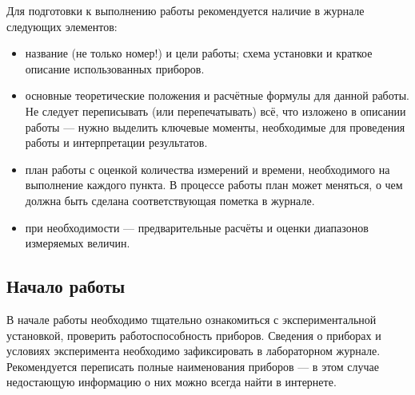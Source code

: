 Для подготовки к выполнению работы рекомендуется наличие в журнале следующих элементов:
\begin{itemize}
    \small
    \item название (не только номер!) и цели работы; схема установки и краткое описание использованных приборов.


    \item основные теоретические положения и расчётные формулы для данной работы.
    Не следует переписывать (или перепечатывать) всё, что изложено в описании
    работы --- нужно выделить ключевые моменты, необходимые для
    проведения работы и интерпретации результатов.

 \item план работы с оценкой количества измерений и времени, необходимого на выполнение каждого пункта.
В процессе работы план может меняться, о чем должна
быть сделана соответствующая пометка в журнале.
     \item при необходимости --- предварительные расчёты и оценки
     диапазонов измеряемых величин.
\end{itemize}

\subsection{Начало работы}

В начале работы необходимо тщательно ознакомиться с экспериментальной
установкой, проверить работоспособность приборов. Сведения о приборах
и условиях эксперимента необходимо
зафиксировать в лабораторном журнале. Рекомендуется переписать полные наименования
приборов --- в этом случае недостающую информацию о них можно всегда найти в интернете.




